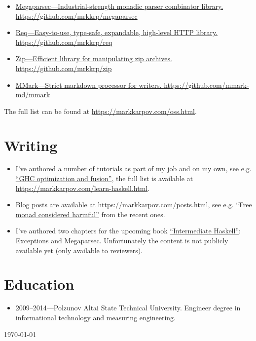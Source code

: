 \documentclass[a4paper,12pt]{article}
\begin{document}
\begin{itemize}[noitemsep]
\item \href{https://github.com/mrkkrp/megaparsec}
  {Megaparsec---Industrial-strength monadic parser combinator library.
    \newline
    https://github.com/mrkkrp/megaparsec}
\item \href{https://github.com/mrkkrp/req}
  {Req---Easy-to-use, type-safe, expandable, high-level HTTP library.
    \newline
    https://github.com/mrkkrp/req}
\item \href{https://github.com/mrkkrp/zip}
  {Zip---Efficient library for manipulating zip archives.
    \newline
    https://github.com/mrkkrp/zip}
\item \href{https://github.com/mmark-md/mmark}
  {MMark---Strict markdown processor for writers.
    \newline
    https://github.com/mmark-md/mmark}
\end{itemize}

The full list can be found at \href{https://markkarpov.com/oss.html}{https://markkarpov.com/oss.html}.

\section*{Writing}

\begin{itemize}[noitemsep]
\item I've authored a number of tutorials as part of my job and on my own,
  see e.g.
  \href{https://www.stackbuilders.com/tutorials/haskell/ghc-optimization-and-fusion/}{“GHC
    optimization and fusion”}, the full list is available at \\
  \href{https://markkarpov.com/learn-haskell.html}{https://markkarpov.com/learn-haskell.html}.
\item Blog posts are available at
  \href{https://markkarpov.com/posts.html}{https://markkarpov.com/posts.html},
  see e.g.
  \href{https://markkarpov.com/post/free-monad-considered-harmful.html}{“Free
    monad considered harmful”} from the recent ones.
\item I've authored two chapters for the upcoming book
  \href{https://intermediatehaskell.com/}{“Intermediate Haskell”}:
  Exceptions and Megaparsec. Unfortunately the content is not publicly
  available yet (only available to reviewers).
\end{itemize}

\section*{Education}

\begin{itemize}[noitemsep]
\item 2009--2014---Polzunov Altai State Technical University. Engineer
  degree in informational technology and measuring engineering.
\end{itemize}

\begin{flushright}
  \today
\end{flushright}
\end{document}

